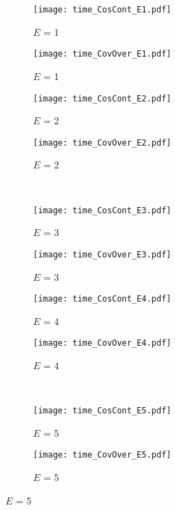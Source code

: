 \documentclass[11pt]{article}
\begin{document}
\begin{figure}[hbt]
\centering
\begin{subfigure}[b]{.24\linewidth}
    \centering
    \texttt{[image: time\_CosCont\_E1.pdf]}
    \caption{$E$ = 1}\label{fig:1a}
  \end{subfigure}%
  \begin{subfigure}[b]{.24\linewidth}
    \centering
    \texttt{[image: time\_CovOver\_E1.pdf]}
    \caption{$E$ = 1}\label{fig:1b}
  \end{subfigure}%
  \begin{subfigure}[b]{.24\linewidth}
    \centering
    \texttt{[image: time\_CosCont\_E2.pdf]}
    \caption{$E$ = 2}\label{fig:1c}
  \end{subfigure}%
  \begin{subfigure}[b]{.24\linewidth}
    \centering
    \texttt{[image: time\_CovOver\_E2.pdf]}
    \caption{$E$ = 2}\label{fig:1d}
  \end{subfigure}\\%
  \begin{subfigure}[b]{.24\linewidth}
    \centering
    \texttt{[image: time\_CosCont\_E3.pdf]}
    \caption{$E$ = 3}\label{fig:1e}
  \end{subfigure}%
  \begin{subfigure}[b]{.24\linewidth}
    \centering
    \texttt{[image: time\_CovOver\_E3.pdf]}
    \caption{$E$ = 3}\label{fig:1f}
  \end{subfigure}%
  \begin{subfigure}[b]{.24\linewidth}
    \centering
    \texttt{[image: time\_CosCont\_E4.pdf]}
    \caption{$E$ = 4}\label{fig:1g}
  \end{subfigure}%
  \begin{subfigure}[b]{.24\linewidth}
    \centering
    \texttt{[image: time\_CovOver\_E4.pdf]}
    \caption{$E$ = 4}\label{fig:1h}
  \end{subfigure}\\%
  \begin{subfigure}[b]{.24\linewidth}
    \centering
    \texttt{[image: time\_CosCont\_E5.pdf]}
    \caption{$E$ = 5}\label{fig:1i}
  \end{subfigure}%
  \begin{subfigure}[b]{.24\linewidth}
    \centering
    \texttt{[image: time\_CovOver\_E5.pdf]}
    \caption{$E$ = 5}\label{fig:1j}

\end{subfigure}
\end{figure}
\end{document}
